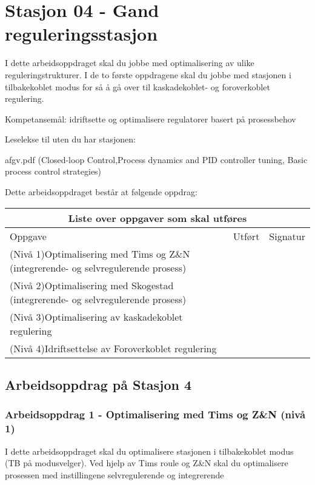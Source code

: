 
\noindent
\section*{Stasjon 04 - Gand reguleringsstasjon}

I dette arbeidsoppdraget skal du jobbe med optimalisering av ulike reguleringstrukturer. I de to første oppdragene skal du jobbe med stasjonen i tilbakekoblet modus for så å gå over til kaskadekoblet- og foroverkoblet regulering. 

\vskip 5pt
Kompetansemål:
idriftsette og optimalisere regulatorer basert på prosessbehov

Leselekse til uten du har stasjonen:

afgv.pdf (Closed-loop Control,Process dynamics and PID controller tuning, Basic process control strategies)

Dette arbeidsoppdraget består at følgende oppdrag:

\begin{center}
\begin{tabular}{ | m{10cm} | m{1cm}| m{2cm} | } 
\hline
\multicolumn{3}{|c|}{Liste over oppgaver som skal utføres} \\
	\hline
	Oppgave	& Utført & Signatur \\ 
	\hline
	\hline
	\cellcolor{green!60}(Nivå 1)Optimalisering med Tims og Z\&N (integrerende- og selvregulerende prosess)	& & \\ 
	\hline
	\cellcolor{yellow!60}(Nivå 2)Optimalisering med Skogestad (integrerende- og selvregulerende prosess)	& & \\ 
	\hline
	\cellcolor{orange!60}(Nivå 3)Optimalisering av kaskadekoblet regulering	& & \\ 
	\hline
	\cellcolor{red!60}(Nivå 4)Idriftsettelse av Foroverkoblet regulering	& & \\ 
	\hline
\end{tabular}
\end{center}

\subsection*{Arbeidsoppdrag på Stasjon 4}

\subsubsection*{Arbeidsoppdrag 1 - Optimalisering med Tims og Z\&N (nivå 1)}

I dette arbeidsoppdraget skal du optimalisere stasjonen i tilbakekoblet modus (TB på modusvelger). Ved hjelp av Tims roule og Z\&N skal du optimalisere prosessen med instillingene selvregulerende og integrerende


